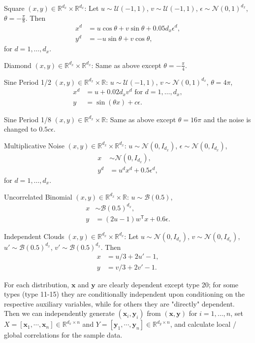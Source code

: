 \documentclass[11pt]{article}
\providecommand{\mb}[1]{\boldsymbol{#1}}
\providecommand{\mc}[1]{\mathcal{#1}}
\newcommand{\Real}{\mathbb{R}}
\newcommand{\T}{^{\ensuremath{\mathsf{T}}}}           %
\newcommand{\mbx}{\ensuremath{\mb{x}}}
\newcommand{\mby}{\ensuremath{\mb{y}}}
\begin{document}
\begin{compactenum}
\item Square $(x,y) \in \Real^{d_{x}} \times \Real^{d_{x}}$: Let $u \sim \mc{U}(-1,1)$, $v \sim \mc{U}(-1,1)$, $\epsilon \sim \mc{N}(0,1)^{d_{x}}$, $\theta=-\frac{\pi}{8}$. Then
\begin{align*}
x^{d}&=u \cos\theta + v \sin\theta + 0.05 d_{x}\epsilon^{d},\\
y^{d}&=-u \sin\theta + v \cos\theta,
\end{align*}
for $d=1,\ldots,d_{x}$.
\item Diamond $(x,y) \in \Real^{d_{x}} \times \Real^{d_{x}}$: Same as above except $\theta=-\frac{\pi}{4}$.
\item Sine Period 1/2 $(x,y) \in \Real^{d_{x}} \times \Real$: $u \sim \mc{U}(-1,1)$, $v \sim \mc{N}(0,1)^{d_{x}}$, $\theta=4\pi$,
\begin{align*}
x^{d}&=u+0.02 d_{x} v^{d} \mbox{ for $d=1,\ldots,d_{x}$}, \\
y&=\sin ( \theta x )+c\epsilon.
\end{align*}
\item Sine Period 1/8 $(x,y) \in \Real^{d_{x}} \times \Real$: Same as above except $\theta=16\pi$ and the noise is changed to $0.5c\epsilon$.
\item Multiplicative Noise $(x,y) \in \Real^{d_{x}} \times \Real^{d_{x}}$: $u \sim \mc{N}(0, I_{d_{x}})$, $\epsilon \sim \mc{N}(0, I_{d_{x}})$,
\begin{align*}
x &\sim \mc{N}(0, I_{d_{x}}),\\
y^{d}&=u^{d}x^{d}+0.5\epsilon^{d},
\end{align*}
for $d=1,\ldots,d_{x}$.
\item Uncorrelated Binomial $(x,y) \in \Real^{d_{x}} \times \Real$: $u \sim \mc{B}(0.5)$,
\begin{align*}
x &\sim \mc{B}(0.5)^{d_{x}},\\ 
y&=(2u-1)w\T x+0.6\epsilon.
\end{align*}
\item Independent Clouds $(x,y) \in \Real^{d_{x}} \times \Real^{d_{x}}$: Let $u \sim \mc{N}(0,I_{d_{x}})$, $v \sim \mc{N}(0,I_{d_{x}})$, $u' \sim \mc{B}(0.5)^{d_{x}}$, $v' \sim \mc{B}(0.5)^{d_{x}}$. Then
\begin{align*}
x&=u/3+2u'-1,\\
y&=v/3+2v'-1.
\end{align*}
\end{compactenum}

For each distribution, $\mb{x}$ and $\mb{y}$ are clearly dependent except type 20; for some types (type 11-15) they are conditionally independent upon conditioning on the respective auxiliary variables, while for others they are "directly" dependent. Then we can independently generate $(\mbx_{i},\mby_{i})$ from $(\mb{x},\mb{y})$ for $i=1,\ldots,n$, set $X=[\mbx_{1},\cdots, \mbx_{n}] \in \Real^{d_{x} \times n}$ and $Y=[\mby_{1},\cdots, \mby_{n}] \in \Real^{d_{y} \times n}$, and calculate local / global correlations for the sample data.
\end{document}
